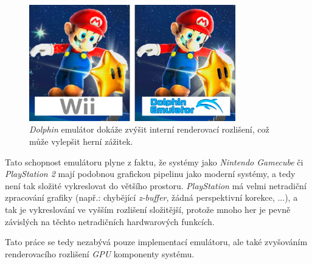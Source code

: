 \begin{figure}[hbt]
\centering
\includegraphics[width=0.8\textwidth]{obrazky-figures/dolphin-resolution.jpg}
\caption{\textit{Dolphin} emulátor dokáže zvýšit interní renderovací rozlišení, což může vylepšit herní zážitek.}
\label{dolphin-resolution}
\end{figure}

Tato schopnost emulátoru plyne z faktu, že systémy jako \textit{Nintendo Gamecube} či \textit{PlayStation 2} mají 
podobnou grafickou pipelinu jako moderní systémy, a tedy není tak složité vykreslovat do většího prostoru. 
\textit{PlayStation} má velmi netradiční zpracování grafiky (např.: chybějící \textit{z-buffer}, žádná perspektivní korekce, ...), 
a tak je vykreslování ve vyšším rozlišení složitější, protože mnoho her je pevně závislých na těchto netradičních hardwarových funkcích.

Tato práce se tedy nezabývá pouze implementací emulátoru, ale také zvyšováním renderovacího rozlišení \textit{GPU} komponenty systému.
